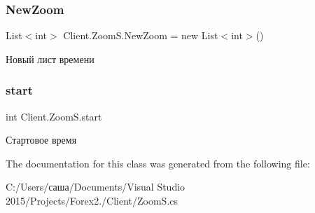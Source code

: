 \subsubsection{\texorpdfstring{New\+Zoom}{NewZoom}}
{\footnotesize\ttfamily List$<$int$>$ Client.\+Zoom\+S.\+New\+Zoom = new List$<$int$>$()}



Новый лист времени 

\hypertarget{class_client_1_1_zoom_s_aa616e068719d96465c5807c6c1b50eac}{}\label{class_client_1_1_zoom_s_aa616e068719d96465c5807c6c1b50eac} 
\subsubsection{\texorpdfstring{start}{start}}
{\footnotesize\ttfamily int Client.\+Zoom\+S.\+start}



Стартовое время 



The documentation for this class was generated from the following file\+:\begin{DoxyCompactItemize}
\item 
C\+:/\+Users/саша/\+Documents/\+Visual Studio 2015/\+Projects/\+Forex2./\+Client/Zoom\+S.\+cs\end{DoxyCompactItemize}
